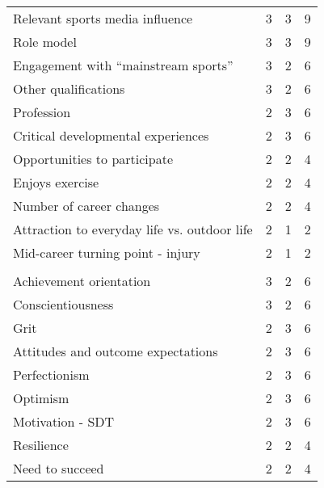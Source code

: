 \documentclass[
  12pt,
  a4paper,
]{book}
\begin{document}
\begin{table}
\begin{tabular}[t]{lrrr}
\hspace{1em}Relevant sports media influence & 3 & 3 & 9\\
\hspace{1em}Role model & 3 & 3 & 9\\
\hspace{1em}Engagement with “mainstream sports” & 3 & 2 & 6\\
\hspace{1em}Other qualifications & 3 & 2 & 6\\
\hspace{1em}Profession & 2 & 3 & 6\\
\hspace{1em}Critical developmental experiences & 2 & 3 & 6\\
\hspace{1em}Opportunities to participate & 2 & 2 & 4\\
\hspace{1em}Enjoys exercise & 2 & 2 & 4\\
\hspace{1em}Number of career changes & 2 & 2 & 4\\
\hspace{1em}Attraction to everyday life vs. outdoor life & 2 & 1 & 2\\
\hspace{1em}Mid-career turning point - injury & 2 & 1 & 2\\
\addlinespace[0.3em]
\multicolumn{4}{l}{\textbf{Candidate personal characteristics}}\\
\hspace{1em}Achievement orientation & 3 & 2 & 6\\
\hspace{1em}Conscientiousness & 3 & 2 & 6\\
\hspace{1em}Grit & 2 & 3 & 6\\
\hspace{1em}Attitudes and outcome expectations & 2 & 3 & 6\\
\hspace{1em}Perfectionism & 2 & 3 & 6\\
\hspace{1em}Optimism & 2 & 3 & 6\\
\hspace{1em}Motivation - SDT & 2 & 3 & 6\\
\hspace{1em}Resilience & 2 & 2 & 4\\
\hspace{1em}Need to succeed & 2 & 2 & 4\\

\end{tabular}
\end{table}
\end{document}
